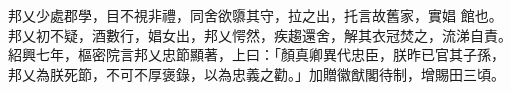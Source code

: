 \begin{pinyinscope}
 邦乂少處郡學，目不視非禮，同舍欲隳其守，拉之出，托言故舊家，實娼
 館也。邦乂初不疑，酒數行，娼女出，邦乂愕然，疾趨還舍，解其衣冠焚之，流涕自責。紹興七年，樞密院言邦乂忠節顯著，上曰：「顏真卿異代忠臣，朕昨已官其子孫，邦乂為朕死節，不可不厚褒錄，以為忠義之勸。」加贈徽猷閣待制，增賜田三頃。



\end{pinyinscope}